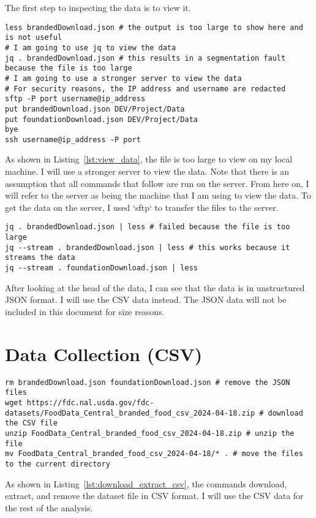 The first step to inspecting the data is to view it.

\begin{lstlisting}[style=bashStyle, caption={View the Data}, label={lst:view_data}]
less brandedDownload.json # the output is too large to show here and is not useful
# I am going to use jq to view the data
jq . brandedDownload.json # this results in a segmentation fault because the file is too large
# I am going to use a stronger server to view the data 
# For security reasons, the IP address and username are redacted
sftp -P port username@ip_address
put brandedDownload.json DEV/Project/Data
put foundationDownload.json DEV/Project/Data
bye
ssh username@ip_address -P port
\end{lstlisting}

As shown in Listing~\ref{lst:view_data}, the file is too large to view on my local machine. I will use a stronger server to view the data. Note that there is an assumption that all commands that follow are run on the server. From here on, I will refer to the server as being the machine that I am using to view the data. To get the data on the server, I used `sftp` to transfer the files to the server.

\begin{lstlisting}[style=bashStyle, caption={View the Data on the Server}, label={lst:view_data_server}]
jq . brandedDownload.json | less # failed because the file is too large
jq --stream . brandedDownload.json | less # this works because it streams the data
jq --stream . foundationDownload.json | less

\end{lstlisting}

After looking at the head of the data, I can see that the data is in unstructured JSON format. I will use the CSV data instead. The JSON data will not be included in this document for size reasons.

\section{Data Collection (CSV)}
\begin{lstlisting}[style=bashStyle, caption={Download, Extract, and Remove Zip File (CSV)}, label={lst:download_extract_csv}]
rm brandedDownload.json foundationDownload.json # remove the JSON files
wget https://fdc.nal.usda.gov/fdc-datasets/FoodData_Central_branded_food_csv_2024-04-18.zip # download the CSV file
unzip FoodData_Central_branded_food_csv_2024-04-18.zip # unzip the file
mv FoodData_Central_branded_food_csv_2024-04-18/* . # move the files to the current directory
\end{lstlisting}
As shown in Listing~\ref{lst:download_extract_csv}, the commands download, extract, and remove the dataset file in CSV format. I will use the CSV data for the rest of the analysis.


